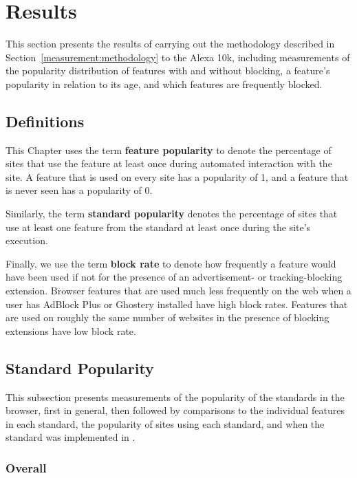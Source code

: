 \section{Results}
\label{measuement:results}

This section presents the results of carrying out the methodology described in
Section~\ref{measurement:methodology} to the Alexa 10k, including measurements
of the popularity distribution of \JS features with and without blocking, a
feature's popularity in relation to its age, and which features are frequently
blocked.


\subsection{Definitions}
This Chapter uses the term \textbf{feature popularity} to
denote the percentage of sites that use the feature at least once during
automated interaction with the site.  A feature that is used on every site has
a popularity of 1, and a feature that is never seen has a popularity of 0.

Similarly, the term \textbf{standard popularity} denotes the
percentage of sites that use at least one feature from the standard at least
once during the site's execution.

Finally, we use the term \textbf{block rate} to denote how frequently a feature
would have been used if not for the presence of an advertisement- or
tracking-blocking extension. Browser features that are used much less
frequently on the web when a user has AdBlock Plus or Ghostery installed have
high block rates. Features that are used on roughly the same number of
websites in the presence of blocking extensions have low block rate.


\subsection{Standard Popularity}
This subsection presents measurements of the popularity of the standards in the
browser, first in general, then followed by comparisons to the individual
features in each standard, the popularity of sites using each standard, and
when the standard was implemented in \FF.


\subsubsection{Overall}



